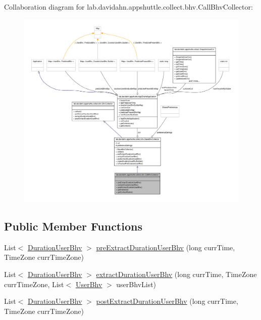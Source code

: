 \-Collaboration diagram for lab.\-davidahn.\-appshuttle.\-collect.\-bhv.\-Call\-Bhv\-Collector\-:
\nopagebreak
\begin{figure}[H]
\begin{center}
\leavevmode
\includegraphics[width=350pt]{classlab_1_1davidahn_1_1appshuttle_1_1collect_1_1bhv_1_1_call_bhv_collector__coll__graph}
\end{center}
\end{figure}
\subsection*{\-Public \-Member \-Functions}
\begin{DoxyCompactItemize}
\item 
\-List$<$ \hyperlink{classlab_1_1davidahn_1_1appshuttle_1_1collect_1_1bhv_1_1_duration_user_bhv}{\-Duration\-User\-Bhv} $>$ \hyperlink{classlab_1_1davidahn_1_1appshuttle_1_1collect_1_1bhv_1_1_call_bhv_collector_ab7baeddab018af5b1efe3fea22766ddf}{pre\-Extract\-Duration\-User\-Bhv} (long curr\-Time, \-Time\-Zone curr\-Time\-Zone)
\item 
\-List$<$ \hyperlink{classlab_1_1davidahn_1_1appshuttle_1_1collect_1_1bhv_1_1_duration_user_bhv}{\-Duration\-User\-Bhv} $>$ \hyperlink{classlab_1_1davidahn_1_1appshuttle_1_1collect_1_1bhv_1_1_call_bhv_collector_aca0984e631fcda500e21c9f58f7d4e02}{extract\-Duration\-User\-Bhv} (long curr\-Time, \-Time\-Zone curr\-Time\-Zone, \-List$<$ \hyperlink{interfacelab_1_1davidahn_1_1appshuttle_1_1collect_1_1bhv_1_1_user_bhv}{\-User\-Bhv} $>$ user\-Bhv\-List)
\item 
\-List$<$ \hyperlink{classlab_1_1davidahn_1_1appshuttle_1_1collect_1_1bhv_1_1_duration_user_bhv}{\-Duration\-User\-Bhv} $>$ \hyperlink{classlab_1_1davidahn_1_1appshuttle_1_1collect_1_1bhv_1_1_call_bhv_collector_a6828e1db3c42799b8850eea045c07831}{post\-Extract\-Duration\-User\-Bhv} (long curr\-Time, \-Time\-Zone curr\-Time\-Zone)
\end{DoxyCompactItemize}
